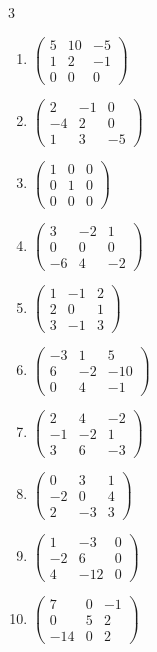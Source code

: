 \begin{multicols}{3}
\begin{enumerate}[label=\arabic*.,  leftmargin=*]
\item $\begin{pmatrix}5&10&-5\\1&2&-1\\0&0&0\end{pmatrix}$
\item $\begin{pmatrix}2&-1&0\\-4&2&0\\1&3&-5\end{pmatrix}$
\item $\begin{pmatrix}1&0&0\\0&1&0\\0&0&0\end{pmatrix}$
\item $\begin{pmatrix}3&-2&1\\0&0&0\\-6&4&-2\end{pmatrix}$
\item $\begin{pmatrix}1&-1&2\\2&0&1\\3&-1&3\end{pmatrix}$
\item $\begin{pmatrix}-3&1&5\\6&-2&-10\\0&4&-1\end{pmatrix}$
\item $\begin{pmatrix}2&4&-2\\-1&-2&1\\3&6&-3\end{pmatrix}$
\item $\begin{pmatrix}0&3&1\\-2&0&4\\2&-3&3\end{pmatrix}$
\item $\begin{pmatrix}1&-3&0\\-2&6&0\\4&-12&0\end{pmatrix}$
\item $\begin{pmatrix}7&0&-1\\0&5&2\\-14&0&2\end{pmatrix}$
\end{enumerate}
\end{multicols}
